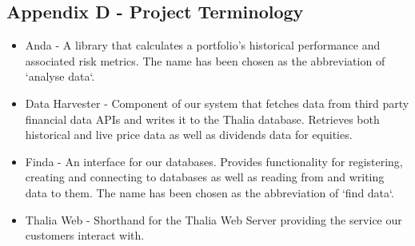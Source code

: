 \documentclass[main.tex]{subfiles}
\begin{document}
\subsection{Appendix D - Project Terminology}
\begin{itemize}
    \item Anda - A library that calculates a portfolio's historical performance and associated risk metrics. The name has been chosen as the abbreviation of `analyse data`.
    \item Data Harvester - Component of our system that fetches data from third party financial data APIs and writes it to the Thalia database. Retrieves both historical and live price data as well as dividends data for equities.
    \item Finda - An interface for our databases. Provides functionality for registering, creating and connecting to databases as well as reading from and writing data to them. The name has been chosen as the abbreviation of `find data`.
    \item Thalia Web - Shorthand for the Thalia Web Server providing the service our customers interact with.
\end{itemize}
\end{document}
